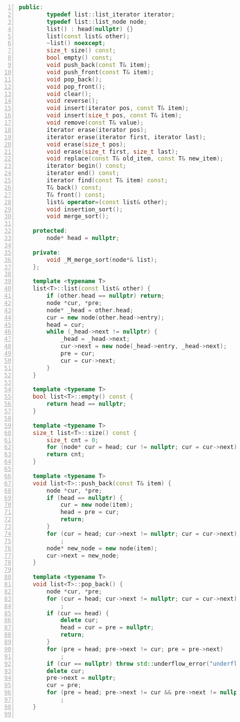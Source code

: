 \documentclass{article}
\begin{document}
\begin{lstlisting}[xleftmargin = 2em,xrightmargin = 2em, aboveskip = 0.5em, numbers = left, language = C++]
    public:
        typedef list::list_iterator iterator;
        typedef list::list_node node;
        list() : head(nullptr) {}
        list(const list& other);
        ~list() noexcept;
        size_t size() const;
        bool empty() const;
        void push_back(const T& item);
        void push_front(const T& item);
        void pop_back();
        void pop_front();
        void clear();
        void reverse();
        void insert(iterator pos, const T& item);
        void insert(size_t pos, const T& item);
        void remove(const T& value);
        iterator erase(iterator pos);
        iterator erase(iterator first, iterator last);
        void erase(size_t pos);
        void erase(size_t first, size_t last);
        void replace(const T& old_item, const T& new_item);
        iterator begin() const;
        iterator end() const;
        iterator find(const T& item) const;
        T& back() const;
        T& front() const;
        list& operator=(const list& other);
        void insertion_sort();
        void merge_sort();

    protected:
        node* head = nullptr;

    private:
        void _M_merge_sort(node*& list);
    };

    template <typename T>
    list<T>::list(const list& other) {
        if (other.head == nullptr) return;
        node *cur, *pre;
        node* _head = other.head;
        cur = new node(other.head->entry);
        head = cur;
        while (_head->next != nullptr) {
            _head = _head->next;
            cur->next = new node(_head->entry, _head->next);
            pre = cur;
            cur = cur->next;
        }
    }

    template <typename T>
    bool list<T>::empty() const {
        return head == nullptr;
    }

    template <typename T>
    size_t list<T>::size() const {
        size_t cnt = 0;
        for (node* cur = head; cur != nullptr; cur = cur->next) cnt++;
        return cnt;
    }

    template <typename T>
    void list<T>::push_back(const T& item) {
        node *cur, *pre;
        if (head == nullptr) {
            cur = new node(item);
            head = pre = cur;
            return;
        }
        for (cur = head; cur->next != nullptr; cur = cur->next)
            ;
        node* new_node = new node(item);
        cur->next = new_node;
    }

    template <typename T>
    void list<T>::pop_back() {
        node *cur, *pre;
        for (cur = head; cur->next != nullptr; cur = cur->next)
            ;
        if (cur == head) {
            delete cur;
            head = cur = pre = nullptr;
            return;
        }
        for (pre = head; pre->next != cur; pre = pre->next)
            ;
        if (cur == nullptr) throw std::underflow_error("underflow");
        delete cur;
        pre->next = nullptr;
        cur = pre;
        for (pre = head; pre->next != cur && pre->next != nullptr; pre = pre->next)
            ;
    }


\end{lstlisting}
\end{document}
